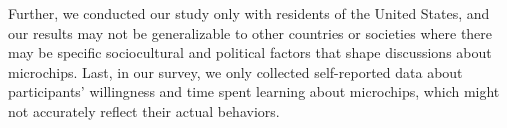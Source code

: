 Further, we conducted our study only with residents of the United States, and our results may not be generalizable to other countries or societies where there may be specific sociocultural and political factors that shape discussions about microchips.
Last, in our survey, we only collected self-reported data about participants' willingness and time spent learning about microchips, which might not accurately reflect their actual behaviors.
